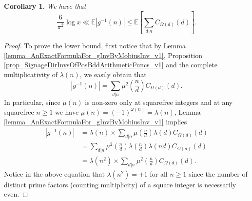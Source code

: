 \documentclass[11pt,reqno,a4letter]{article}
\numberwithin{figure}{section}
\numberwithin{table}{section}
\theoremstyle{plain}
\newtheorem{cor}[theorem]{Corollary}
\numberwithin{theorem}{section}
\theoremstyle{definition}
\begin{document}
\begin{cor} 
\label{lemma_BddExpectationOfgInvn} 
We have that 
\[
\frac{6}{\pi^2} \log x \ll \mathbb{E}|g^{-1}(n)| \leq \mathbb{E}\left[\sum_{d|n} C_{\Omega(d)}(d)\right]. 
\]
\end{cor} 
\begin{proof} 
To prove the lower bound, first notice that by 
Lemma \ref{lemma_AnExactFormulaFor_gInvByMobiusInv_v1}, 
Proposition \ref{prop_SignageDirInvsOfPosBddArithmeticFuncs_v1} and the 
complete multiplicativity of $\lambda(n)$, 
we easily obtain that 
\begin{equation} 
\label{eqn_AbsValueOf_gInvn_FornSquareFree_v1} 
|g^{-1}(n)| = \sum_{d|n} \mu^2\left(\frac{n}{d}\right) C_{\Omega(d)}(d). 
\end{equation} 
In particular, since $\mu(n)$ is non-zero only at squarefree integers and 
at any squarefree $n \geq 1$ we have $\mu(n) = (-1)^{\omega(n)} = \lambda(n)$, 
Lemma \ref{lemma_AnExactFormulaFor_gInvByMobiusInv_v1} implies 
\begin{align*} 
|g^{-1}(n)| & = \lambda(n) \times \sum_{d|n} \mu\left(\frac{n}{d}\right) \lambda(d) C_{\Omega(d)}(d) \\ 
     & = \sum_{d|n} \mu^2\left(\frac{n}{d}\right) \lambda\left(\frac{n}{d}\right) 
     \lambda(nd) C_{\Omega(d)}(d) \\ 
     & = \lambda(n^2) \times \sum_{d|n} \mu^2\left(\frac{n}{d}\right) C_{\Omega(d)}(d). 
\end{align*} 
Notice in the above equation 
that $\lambda(n^2) = +1$ for all $n \geq 1$ since the number of distinct 
prime factors (counting multiplicity) of a square integer is necessarily even. 
     

\end{proof}
\end{document}
